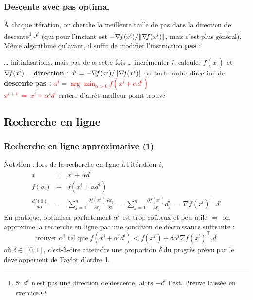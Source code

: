 \documentclass[12pt]{beamer}
\begin{document}
\begin{frame}
\frametitle{Descente avec pas optimal} 
\vspace{-0.5cm}
À chaque itération, on cherche la meilleure taille de pas dans la direction de descente\footnote{Si $d^i$ n’est pas une direction de descente, alors $-d^i$ l’est. Preuve laissée en exercice.} $d^i$ (qui pour l’instant est $-\nabla\!{f}(x^i)/\lVert \nabla\!{f}(x^i) \rVert$, mais c’est plus général).\\ 
Même algorithme qu’avant, il suffit de modifier l’instruction \textbf{pas} :
\begin{block}{}
\begin{algorithmic}
\REQUIRE \ldots
\STATE initialisations, mais pas de $\alpha$ cette fois \ldots
\REPEAT
\STATE incrémenter $i$, calculer $f(x^i)$ et $\nabla\!{f}(x^i)$ \ldots
\STATE \textbf{direction : } $d^i = - \nabla\!{f}(x^i) / \lVert \nabla\!{f}(x^i) \rVert$ ou toute autre direction de \textbf{descente}
\STATE \textbf{pas : } \textcolor{red}{$\alpha^{i} = \arg \min_{\alpha > 0} f(x^i+\alpha d^i)$ \\
\hspace{1.5cm}$x^{i+1} ~=~ x^i + \alpha^i d^i$
} %
\UNTIL critère d’arrêt
\RETURN meilleur point trouvé
\end{algorithmic}
\end{block}
\end{frame}

\subsection{Recherche en ligne}


\begin{frame}
\frametitle{Recherche en ligne approximative (1)} 
Notation : lors de la recherche en ligne à l’itération $i$, 
\begin{eqnarray*}
x &=& x^i + \alpha d^i \\
f(\alpha) &=& f(x^i + \alpha d^i) \\
\frac{df(0)}{d\alpha} &=& \sum_{j=1}^n \frac{\partial f(x^i)}{\partial x_j} \frac{\partial x_j}{\partial \alpha}
~=~\sum_{j=1}^n \frac{\partial f(x^i)}{\partial x_j} d^i_j
~=~ \nabla f(x^i)^\top . d^i
\end{eqnarray*}
En pratique, optimiser parfaitement $\alpha^i$ est trop coûteux et peu utile 
$\Rightarrow$ on approxime la recherche en ligne par une condition de décroissance suffisante :
\begin{equation*}
\text{trouver } \alpha^i \text{ tel que } f(x^i + \alpha^i d^i) < f(x^i) + \delta \alpha^i \nabla f(x^i)^\top . d^i
\end{equation*}
où $\delta \in [0,1]$, c’est-à-dire atteindre une proportion $\delta$ du progrès prévu par le développement de Taylor d’ordre 1.
\end{frame}
\end{document}
